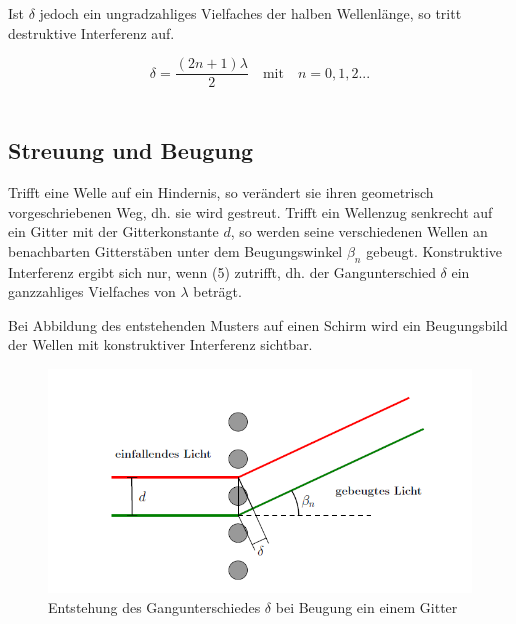 \documentclass[12pt,a4paper,titlepage,headinclude,bibtotoc]{scrartcl}
\begin{document}
Ist $\delta$ jedoch ein ungradzahliges Vielfaches der halben Wellenlänge, so tritt destruktive Interferenz auf. \\
\par
\begin{equation}
\delta = \frac{(2n+1)\lambda}{2} \quad \mathrm{mit}\quad  n=0,1,2...
\end{equation}
\\
\par


\subsection{Streuung und Beugung}
Trifft eine Welle auf ein Hindernis, so verändert sie ihren geometrisch vorgeschriebenen Weg, dh. sie wird gestreut. %
Trifft ein Wellenzug senkrecht auf ein Gitter mit der Gitterkonstante $d$, so werden seine verschiedenen Wellen an benachbarten Gitterstäben unter dem Beugungswinkel $\beta_n$ gebeugt. Konstruktive Interferenz ergibt sich nur, wenn (5) zutrifft, dh. der Gangunterschied $\delta$ ein ganzzahliges Vielfaches von $\lambda$ beträgt.

Bei Abbildung des entstehenden Musters auf einen Schirm wird ein Beugungsbild der Wellen mit konstruktiver Interferenz sichtbar.

\begin{figure} [h]
\begin{center}
\includegraphics[scale=0.75]{Gangunterschied.png} \end{center}
\caption{Entstehung des Gangunterschiedes $\delta$ bei Beugung ein einem Gitter}
\end{figure}
\end{document}
